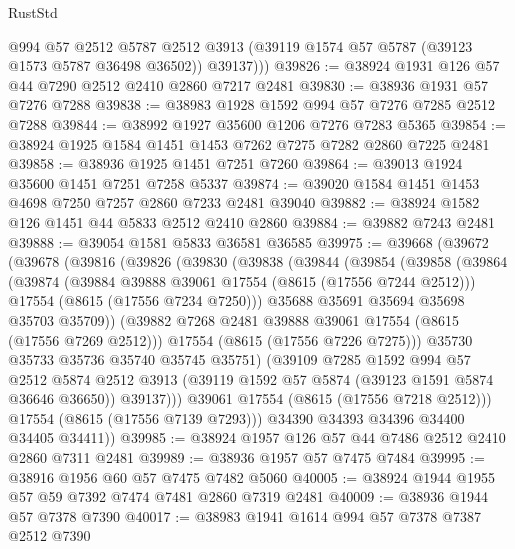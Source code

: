 \begin{lexlean}{RustStd}
\begin{coremodule}
          @994
          @57
          @2512
          @5787
          @2512
          @3913
          (@39119 @1574 @57 @5787 (@39123 @1573 @5787 @36498 @36502))
          @39137)))
@39826 := @38924 @1931 @126 @57 @44 @7290 @2512 @2410 @2860 @7217 @2481
@39830 := @38936 @1931 @57 @7276 @7288
@39838 := @38983 @1928 @1592 @994 @57 @7276 @7285 @2512 @7288
@39844 := @38992 @1927 @35600 @1206 @7276 @7283 @5365
@39854 := @38924 @1925 @1584 @1451 @1453 @7262 @7275 @7282 @2860 @7225 @2481
@39858 := @38936 @1925 @1451 @7251 @7260
@39864 := @39013 @1924 @35600 @1451 @7251 @7258 @5337
@39874 := @39020 @1584 @1451 @1453 @4698 @7250 @7257 @2860 @7233 @2481 @39040
@39882 := @38924 @1582 @126 @1451 @44 @5833 @2512 @2410 @2860
@39884 := @39882 @7243 @2481
@39888 := @39054 @1581 @5833 @36581 @36585
@39975 := @39668
    (@39672
      (@39678
        (@39816
          (@39826
            (@39830
              (@39838
                (@39844
                  (@39854
                    (@39858
                      (@39864
                        (@39874
                          (@39884 @39888 @39061 @17554 (@8615 (@17556 @7244 @2512)))
                          @17554
                          (@8615 (@17556 @7234 @7250)))
                        @35688
                        @35691
                        @35694
                        @35698
                        @35703
                        @35709))
                    (@39882 @7268 @2481 @39888 @39061 @17554 (@8615 (@17556 @7269 @2512)))
                    @17554
                    (@8615 (@17556 @7226 @7275)))
                  @35730
                  @35733
                  @35736
                  @35740
                  @35745
                  @35751)
                (@39109
                  @7285
                  @1592
                  @994
                  @57
                  @2512
                  @5874
                  @2512
                  @3913
                  (@39119 @1592 @57 @5874 (@39123 @1591 @5874 @36646 @36650))
                  @39137)))
            @39061
            @17554
            (@8615 (@17556 @7218 @2512)))
          @17554
          (@8615 (@17556 @7139 @7293)))
        @34390
        @34393
        @34396
        @34400
        @34405
        @34411))
@39985 := @38924 @1957 @126 @57 @44 @7486 @2512 @2410 @2860 @7311 @2481
@39989 := @38936 @1957 @57 @7475 @7484
@39995 := @38916 @1956 @60 @57 @7475 @7482 @5060
@40005 := @38924 @1944 @1955 @57 @59 @7392 @7474 @7481 @2860 @7319 @2481
@40009 := @38936 @1944 @57 @7378 @7390
@40017 := @38983 @1941 @1614 @994 @57 @7378 @7387 @2512 @7390

\end{coremodule}
\end{lexlean}
